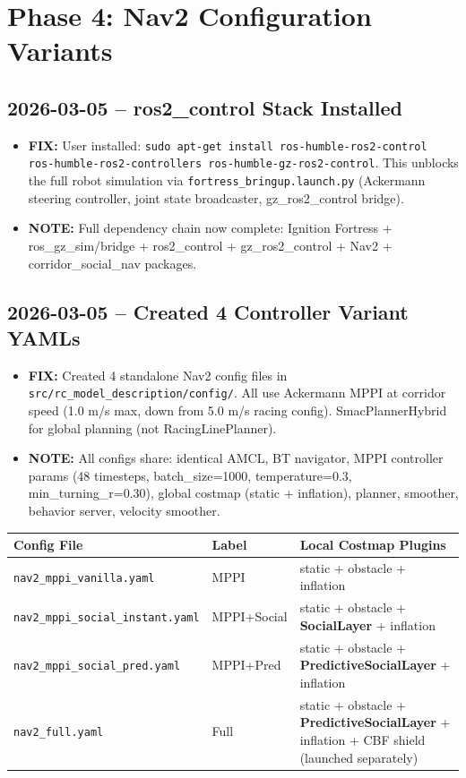 \documentclass[11pt]{article}
\newcommand{\logentry}[1]{\subsection*{#1}}
\newcommand{\fix}[1]{\textcolor{fixgreen}{\textbf{FIX:} #1}}
\newcommand{\note}[1]{\textcolor{notblue}{\textbf{NOTE:} #1}}
\begin{document}
\section{Phase 4: Nav2 Configuration Variants}

\logentry{2026-03-05 -- ros2\_control Stack Installed}
\begin{itemize}
  \item \fix{User installed: \texttt{sudo apt-get install ros-humble-ros2-control ros-humble-ros2-controllers ros-humble-gz-ros2-control}. This unblocks the full robot simulation via \texttt{fortress\_bringup.launch.py} (Ackermann steering controller, joint state broadcaster, gz\_ros2\_control bridge).}
  \item \note{Full dependency chain now complete: Ignition Fortress + ros\_gz\_sim/bridge + ros2\_control + gz\_ros2\_control + Nav2 + corridor\_social\_nav packages.}
\end{itemize}

\logentry{2026-03-05 -- Created 4 Controller Variant YAMLs}
\begin{itemize}
  \item \fix{Created 4 standalone Nav2 config files in \texttt{src/rc\_model\_description/config/}. All use Ackermann MPPI at corridor speed (1.0 m/s max, down from 5.0 m/s racing config). SmacPlannerHybrid for global planning (not RacingLinePlanner).}
  \item \note{All configs share: identical AMCL, BT navigator, MPPI controller params (48 timesteps, batch\_size=1000, temperature=0.3, min\_turning\_r=0.30), global costmap (static + inflation), planner, smoother, behavior server, velocity smoother.}
\end{itemize}

\begin{center}
\small
\begin{tabular}{|l|l|p{6cm}|}
\hline
\textbf{Config File} & \textbf{Label} & \textbf{Local Costmap Plugins} \\
\hline
\texttt{nav2\_mppi\_vanilla.yaml} & MPPI & static + obstacle + inflation \\
\texttt{nav2\_mppi\_social\_instant.yaml} & MPPI+Social & static + obstacle + \textbf{SocialLayer} + inflation \\
\texttt{nav2\_mppi\_social\_pred.yaml} & MPPI+Pred & static + obstacle + \textbf{PredictiveSocialLayer} + inflation \\
\texttt{nav2\_full.yaml} & Full & static + obstacle + \textbf{PredictiveSocialLayer} + inflation + CBF shield (launched separately) \\
\hline
\end{tabular}
\end{center}
\end{document}
